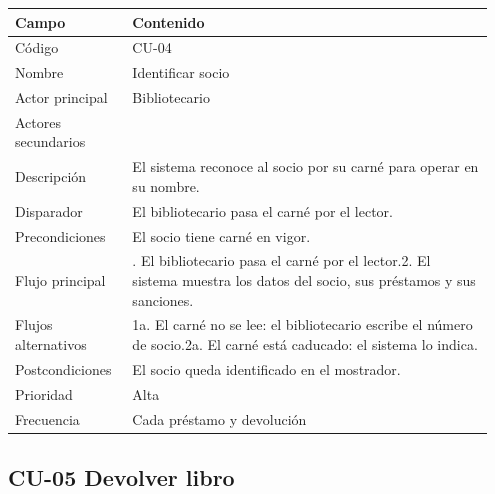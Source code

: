 \documentclass[11pt,a4paper]{article}
\begin{document}
{\small
\begin{longtable}{@{}>{\raggedright\arraybackslash}p{0.232\linewidth}>{\raggedright\arraybackslash}p{0.717\linewidth}@{}}
\toprule
\textbf{Campo} & \textbf{Contenido} \\
\midrule
\endhead
Código & CU-04 \\
Nombre & Identificar socio \\
Actor principal & Bibliotecario \\
Actores secundarios &  \\
Descripción & El sistema reconoce al socio por su carné para operar en su nombre. \\
Disparador & El bibliotecario pasa el carné por el lector. \\
Precondiciones & El socio tiene carné en vigor. \\
Flujo principal & 1. El bibliotecario pasa el carné por el lector.\newline{}2. El sistema muestra los datos del socio, sus préstamos y sus sanciones. \\
Flujos alternativos & 1a. El carné no se lee: el bibliotecario escribe el número de socio.\newline{}2a. El carné está caducado: el sistema lo indica. \\
Postcondiciones & El socio queda identificado en el mostrador. \\
Prioridad & Alta \\
Frecuencia & Cada préstamo y devolución \\
\bottomrule
\end{longtable}}

\subsection*{CU-05 Devolver libro}
\end{document}
